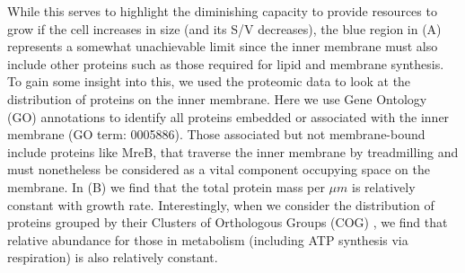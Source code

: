 While this serves to highlight the diminishing capacity to provide resources to
grow if the cell increases in size (and its S/V decreases), the blue region in
(A) represents a somewhat unachievable limit since the inner
membrane must also include other proteins such as those required for lipid and
membrane synthesis. To gain some insight into this, we used the proteomic data
to look at the distribution of proteins on the inner membrane. Here we use Gene
Ontology (GO) annotations \citep{ashburner2000,thegeneOntologyconsortium2018} to
identify all proteins embedded or associated with the inner membrane (GO term:
0005886). Those associated but not membrane-bound include proteins like MreB, that
traverse the inner membrane by treadmilling and must nonetheless be considered
as a vital component occupying space on the membrane. In (B)
we find that the total protein mass per $\mu m$ is relatively constant with
growth rate. Interestingly, when we consider the distribution of proteins
grouped by their Clusters of Orthologous Groups (COG) \citep{tatusov2000}, we
find that relative abundance for those in metabolism (including ATP synthesis
via respiration) is also relatively constant.





